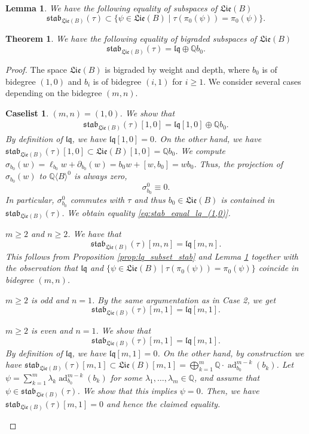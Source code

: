 \documentclass[10pt,a4paper]{amsart}
\newtheorem{lemma}{Lemma}
\newtheorem{theorem}{Theorem}
\newtheorem{caselist}{Caselist}
\newcommand{\Lie}{\mathfrak{Lie}}
\newcommand{\Q}{\mathbb{Q}}
\newcommand{\QB}{\Q\langle B\rangle}
\newcommand{\ad}{\operatorname{ad}}
\newcommand{\lqq}{\mathfrak{lq}}
\newcommand{\stab}{\mathfrak{stab}}
\begin{document}
\begin{lemma} \label{lem:stab_subset_tau_inv}
We have the following equality of subspaces of $\Lie(B)$
\[
\stab_{\Lie(B)}(\tau)\subset\{\psi\in\Lie(B)\mid \tau(\pi_0(\psi))=\pi_0(\psi)\}.
\]
\end{lemma}

\begin{theorem} \label{thm:stab_equal_lq} We have the following equality of bigraded subspaces of $\Lie(B)$
\[
\stab_{\Lie(B)}(\tau)=\lqq\oplus \Q b_0.
\]
\end{theorem}

\begin{proof} The space $\Lie(B)$ is bigraded by weight and depth, where $b_0$ is of bidegree $(1,0)$ and $b_i$ is of bidegree $(i,1)$ for $i\geq1$. We consider several cases depending on the bidegree $(m,n)$.

\begin{caselist}
\item $(m,n)=(1,0)$. We show that
\begin{align} \label{eq:stab_equal_lq_(1,0)}
\stab_{\Lie(B)}(\tau)[1,0]=\lqq[1,0]\oplus\Q b_0.
\end{align}
By definition of $\lqq$, we have $\lqq[1,0]=0$. On the other hand, we have $\stab_{\Lie(B)}(\tau)[1,0]\subset \Lie(B)[1,0]=\Q b_0$. We compute $\sigma_{b_0}(w)=\ell_{b_0}w+\partial_{b_0}(w)=b_0w+[w,b_0]=wb_0$. Thus, the projection of $\sigma_{b_0}(w)$ to $\QB^0$ is always zero,
\[\sigma_{b_0}^0\equiv 0.\]
In particular, $\sigma_{b_0}^0$ commutes with $\tau$ and thus $b_0\in \Lie(B)$ is contained in $\stab_{\Lie(B)}(\tau)$. We obtain equality \eqref{eq:stab_equal_lq_(1,0)}. 
\item $m\geq 2$ and $n\geq2$. We have that
\[\stab_{\Lie(B)}(\tau)[m,n]=\lqq[m,n].\]
This follows from Proposition \ref{prop:lq_subset_stab} and Lemma \ref{lem:stab_subset_tau_inv} together with the observation that $\lqq$ and $\{\psi\in\Lie(B)\mid \tau(\pi_0(\psi))=\pi_0(\psi)\}$ coincide in bidegree $(m,n)$.
\item $m \geq 2$ is odd and $n=1$. By the same argumentation as in Case 2, we get
\[
\stab_{\Lie(B)}(\tau)[m,1]=\lqq[m,1].
\]
\item $m \geq 2$ is even and $n=1$. We show that
\[
\stab_{\Lie(B)}(\tau)[m,1]=\lqq[m,1].
\]
By definition of $\lqq$, we have $\lqq[m,1]=0$. On the other hand, by construction we have $\stab_{\Lie(B)}(\tau)[m,1]\subset \Lie(B)[m,1]=\bigoplus_{k=1}^m\Q \cdot \ad_{b_0}^{m-k}(b_k)$. Let $\psi=\sum_{k=1}^m \lambda_k \ad_{b_0}^{m-k}(b_k) $ for some $\lambda_1,\ldots,\lambda_m \in \Q$, and assume that $\psi\in \stab_{\Lie(B)}(\tau)$. We show that this implies $\psi=0$. Then, we have $\stab_{\Lie(B)}(\tau)[m,1]=0$ and hence the claimed equality.


\end{caselist}
\end{proof}
\end{document}

